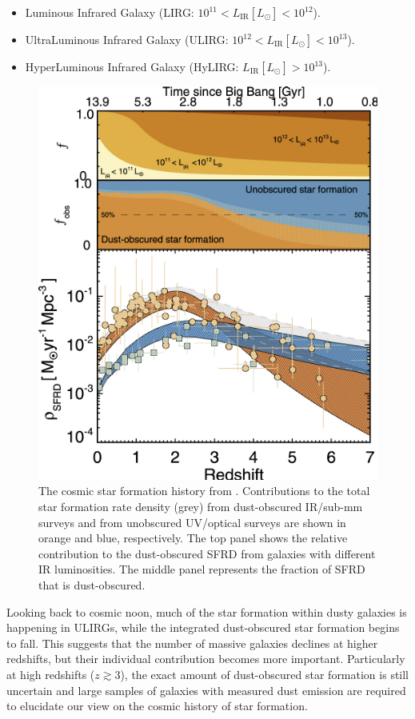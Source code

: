 \begin{itemize}
    \item Luminous Infrared Galaxy (LIRG: $10^{11} < L_\textrm{IR} [L_\odot] < 10^{12}$).
    \item UltraLuminous Infrared Galaxy (ULIRG: $10^{12} < L_\textrm{IR} [L_\odot] < 10^{13}$).
    \item HyperLuminous Infrared Galaxy (HyLIRG: $L_\textrm{IR} [L_\odot] > 10^{13}$).
\end{itemize}

\begin{figure}
    \centering
	\includegraphics[width=0.8\columnwidth]{Figures/cosmic_sfrd.pdf}
	\caption[Cosmic star formation history]{The cosmic star formation history from \citealt{Zavala_2021}. Contributions to the total star formation rate density (grey) from dust-obscured IR/sub-mm surveys and from unobscured UV/optical surveys are shown in orange and blue, respectively. The top panel shows the relative contribution to the dust-obscured SFRD from galaxies with different IR luminosities. The middle panel represents the fraction of SFRD that is dust-obscured.}
	\label{fig:cosmic_sfrd}
\end{figure}

Looking back to cosmic noon, much of the star formation within dusty galaxies is happening in ULIRGs, while the integrated dust-obscured star formation begins to fall. This suggests that the number of massive galaxies declines at higher redshifts, but their individual contribution becomes more important. Particularly at high redshifts ($z \gtrsim 3$), the exact amount of dust-obscured star formation is still uncertain and large samples of galaxies with measured dust emission are required to elucidate our view on the cosmic history of star formation.

